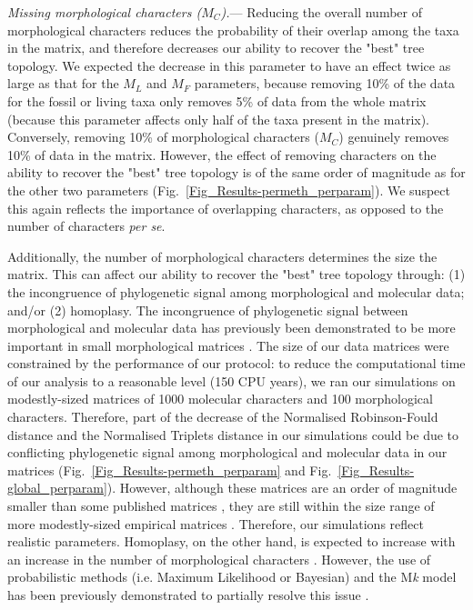 \documentclass[12pt,letterpaper]{article}
\renewcommand{\subsubsection}[1]{%
\vspace{2ex}
\noindent
\textit{#1.}---}
\begin{document}
\subsubsection{Missing morphological characters ($M_{C}$)}
Reducing the overall number of morphological characters reduces the probability of their overlap among the taxa in the matrix, and therefore decreases our ability to recover the "best" tree topology. We expected the decrease in this parameter to have an effect twice as large as that for the $M_{L}$ and $M_{F}$ parameters, because removing 10\% of the data for the fossil or living taxa only removes 5\% of data from the whole matrix (because this parameter affects only half of the taxa present in the matrix). Conversely, removing 10\% of morphological characters ($M_{C}$) genuinely removes 10\% of data in the matrix. However, the effect of removing characters on the ability to recover the "best" tree topology is of the same order of magnitude as for the other two parameters (Fig.~\ref{Fig_Results-permeth_perparam}). We suspect this again reflects the importance of overlapping characters, as opposed to the number of characters \textit{per se}.

Additionally, the number of morphological characters determines the size the matrix. This can affect our ability to recover the "best" tree topology through: (1) the incongruence of phylogenetic signal among morphological and molecular data; and/or (2) homoplasy. The incongruence of phylogenetic signal between morphological and molecular data has previously been demonstrated to be more important in small morphological matrices \citep{wagner2000}. The size of our data matrices were constrained by the performance of our protocol: to reduce the computational time of our analysis to a reasonable level (150 CPU years), we ran our simulations on modestly-sized matrices of 1000 molecular characters and 100 morphological characters. Therefore, part of the decrease of the Normalised Robinson-Fould distance and the Normalised Triplets distance in our simulations could be due to conflicting phylogenetic signal among morphological and molecular data in our matrices (Fig.~\ref{Fig_Results-permeth_perparam} and Fig.~\ref{Fig_Results-global_perparam}). However, although these matrices are an order of magnitude smaller than some published matrices \citep[e.g.][]{springermacroevolutionary2012,nithe2013}, they are still within the size range of more modestly-sized empirical matrices \citep[e.g.][]{kellymolecular2014, sallam2011craniodental}. Therefore, our simulations reflect realistic parameters. Homoplasy, on the other hand, is expected to increase with an increase in the number of morphological characters \citep{wrightbayesian2014}. %
However, the use of probabilistic methods (i.e. Maximum Likelihood or Bayesian) and the M\textit{k} model \citep{lewisa2001} has been previously demonstrated to partially resolve this issue \citep{wrightbayesian2014}.
\end{document}
